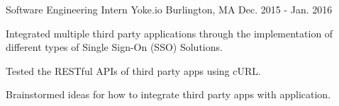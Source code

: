 \begin{cventries}
  \cventry
    {Software Engineering Intern}
    {Yoke.io}
    {Burlington, MA}
    {Dec. 2015 - Jan. 2016}
    {
      \begin{cvitems}
        \item {Integrated multiple third party applications through the implementation of different types of Single Sign-On (SSO) Solutions.}
        \item {Tested the RESTful APIs of third party apps using cURL.}
        \item{Brainstormed ideas for how to integrate third party apps with application.}
      \end{cvitems} 
    }
\end{cventries}
